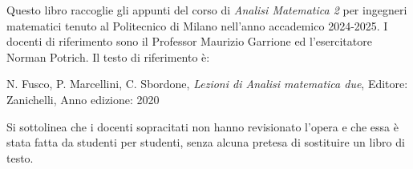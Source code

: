 Questo libro raccoglie gli appunti del corso di \emph{Analisi Matematica 2} per ingegneri matematici tenuto al Politecnico di Milano nell'anno accademico 2024-2025. I docenti di riferimento sono il Professor Maurizio Garrione ed l'esercitatore Norman Potrich.
Il testo di riferimento è:

N. Fusco, P. Marcellini, C. Sbordone, \textit{Lezioni di Analisi matematica due}, Editore: Zanichelli, Anno edizione: 2020


Si sottolinea che i docenti sopracitati non hanno revisionato l'opera e che essa è stata fatta da studenti per studenti, senza alcuna pretesa di sostituire un libro di testo.